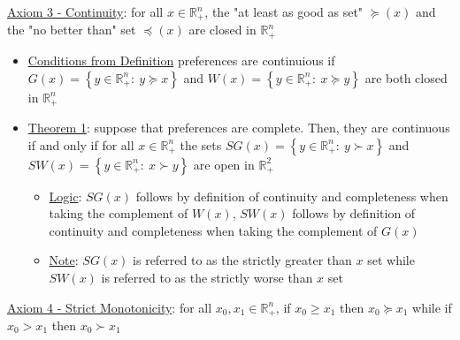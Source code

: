 \documentclass{article}
\begin{document}
  \par
  \underline{Axiom 3 - Continuity}: for all $x \in \mathbb{R}_{+}^{n}$, the "at least as good as set" $\succeq (x)$ and the "no better than" set $\preceq (x)$ are closed in $\mathbb{R}_{+}^{n}$
  \begin{itemize}
    \item  \underline{Conditions from Definition} preferences are continuious if $G(x) = \left\{ y \in \mathbb{R}_{+}^{n}: \ y \succeq x \right\}$ and $W(x) = \left\{ y \in \mathbb{R}_{+}^{n}: \ x \succeq y \right\}$ are both closed in $\mathbb{R}_{+}^{n}$
    \item  \underline{Theorem 1}: suppose that preferences are complete. Then, they are continuous if and only if for all $x \in \mathbb{R}_{+}^{n}$ the sets $SG(x) = \left\{ y \in \mathbb{R}_{+}^{n}: \ y \succ x \right\}$ and $SW(x) = \left\{ y \in \mathbb{R}_{+}^{n}: \ x \succ y \right\}$ are open in $\mathbb{R}_{+}^{2}$
    \begin{itemize}
      \item  \underline{Logic}: $SG(x)$ follows by definition of continuity and completeness when taking the complement of $W(x)$, $SW(x)$ follows by definition of continuity and completeness when taking the complement of $G(x)$
      \item  \underline{Note}: $SG(x)$ is referred to as the strictly greater than $x$ set while $SW(x)$ is referred to as the strictly worse than $x$ set
    \end{itemize}
  \end{itemize}
  \par
  \underline{Axiom 4 - Strict Monotonicity}: for all $x_{0}, x_{1} \in \mathbb{R}_{+}^{n}$, if $x_{0} \geq x_{1}$ then $x_{0} \succeq x_{1}$ while if $x_{0} > x_{1}$ then $x_{0} \succ x_{1}$
\end{document}
